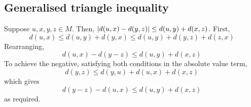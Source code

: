 \subsection{Generalised triangle inequality}
Suppose \( u,x,y,z \in M \).
Then, \( \abs{d(u,x) - d(y,z)} \leq d(u,y) + d(x,z) \).
First,
\[
	d(u,x) \leq d(u,y) + d(y,x) \leq d(u,y) + d(y,z) + d(z,x)
\]
Rearranging,
\[
	d(u,x)-d(y-z) \leq d(u,y) + d(x,z)
\]
To achieve the negative, satisfying both conditions in the absolute value term,
\[
	d(y,z) \leq d(y,u) + d(u,x) + d(x,z)
\]
which gives
\[
	d(y-z) - d(u,x) \leq d(u,y) + d(x,z)
\]
as required.
